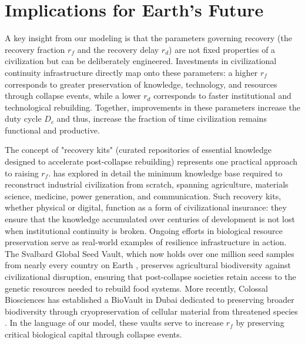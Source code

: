 \section{Implications for Earth's Future}\label{earth-implications}

A key insight from our modeling is that the parameters governing recovery (the recovery fraction $r_f$ and the recovery delay $r_d$) are not fixed properties of a civilization but can be deliberately engineered. Investments in civilizational continuity infrastructure directly map onto these parameters: a higher $r_f$ corresponds to greater preservation of knowledge, technology, and resources through collapse events, while a lower $r_d$ corresponds to faster institutional and technological rebuilding. Together, improvements in these parameters increase the duty cycle $D_c$ and thus, increase the fraction of time civilization remains functional and productive.

The concept of "recovery kits" (curated repositories of essential knowledge designed to accelerate post-collapse rebuilding) represents one practical approach to raising $r_f$. \citet{Dartnell2014-tk} has explored in detail the minimum knowledge base required to reconstruct industrial civilization from scratch, spanning agriculture, materials science, medicine, power generation, and communication. Such recovery kits, whether physical or digital, function as a form of civilizational insurance: they ensure that the knowledge accumulated over centuries of development is not lost when institutional continuity is broken. Ongoing efforts in biological resource preservation serve as real-world examples of resilience infrastructure in action. The Svalbard Global Seed Vault, which now holds over one million seed samples from nearly every country on Earth \citep{Asdal2020-sv}, preserves agricultural biodiversity against civilizational disruption, ensuring that post-collapse societies retain access to the genetic resources needed to rebuild food systems. More recently, Colossal Biosciences has established a BioVault in Dubai dedicated to preserving broader biodiversity through cryopreservation of cellular material from threatened species \citep{Colossal2024-bv}. In the language of our model, these vaults serve to increase $r_f$ by preserving critical biological capital through collapse events.

